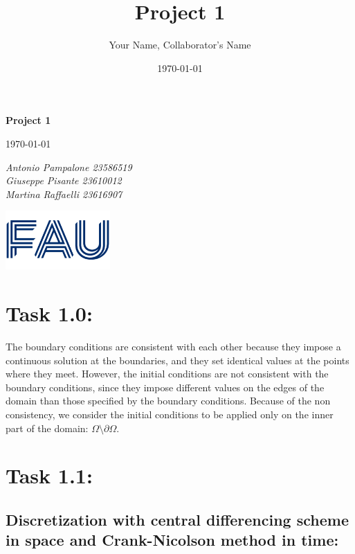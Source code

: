 \documentclass{article}
\title{Project 1}
\author{Your Name, Collaborator's Name}
\date{\today}
\begin{document}
\begin{titlepage}
    \centering
    \vspace*{1in}
    
    {\Huge\bfseries Project 1\par}
    \vspace{1.5cm}
    {\Large \today\par}
    \vspace{1.5cm}
    {\Large\itshape Antonio Pampalone 23586519 \\ Giuseppe Pisante 23610012\\ Martina Raffaelli 23616907 \par}
    
    \vfill
    \includegraphics[width=0.3\textwidth]{FAU-Logo.png}\par\vspace{1cm} %
   
\end{titlepage}

\newpage
\small

\section*{\Large Task 1.0:}

The boundary conditions are consistent with each other because they impose a continuous solution at the boundaries, and they set identical values at the points where they meet. However, the initial conditions are not consistent with the boundary conditions, since they impose different values on the edges of the domain than those specified by the boundary conditions. Because of the non consistency, we consider the initial conditions to be applied only on the inner part of the domain: $\Omega \setminus \partial \Omega$. 

\section*{\Large Task 1.1:}

\subsection*{Discretization with central differencing scheme in space and Crank-Nicolson method in time:}
\end{document}
